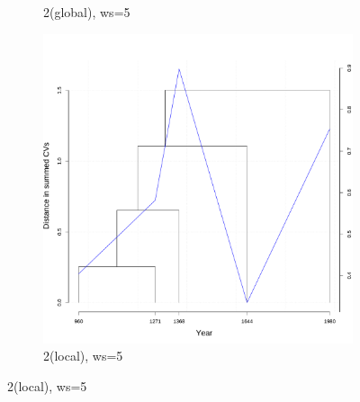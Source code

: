 \begin{figure}[H]
\begin{subfigure}{0.3\textwidth}
    \caption*{2\nds  (global), ws=5}
  \end{subfigure}
  \quad
  \begin{subfigure}{0.3\textwidth}
    \includegraphics[width=\linewidth]{figures_new/measures/VNC_measure_dist_w5_second_embed_local.pdf}
    \caption*{2\nds  (local), ws=5}
  \end{subfigure}
  

\end{figure}
